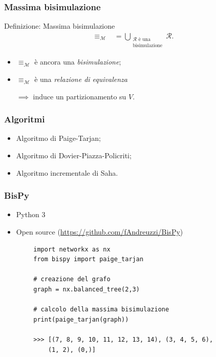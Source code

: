 \documentclass{beamer}
\begin{document}
\begin{frame}\frametitle{Massima bisimulazione}
    \begin{block}{Definizione: Massima bisimulazione}
        \begin{gather*}
            \equiv_\mathcal{M} \,\,\,\,\,= \bigcup_{\substack{\mathcal{R} \text{ è una}\\\text{bisimulazione}}} \mathcal{R}.
        \end{gather*}
    \end{block}
    \begin{itemize}
        \item $\equiv_\mathcal{M}$ è ancora una \emph{bisimulazione};
        \item $\equiv_\mathcal{M}$ è una \emph{relazione di equivalenza}

        $\implies$ induce un partizionamento su $V$.
    \end{itemize}
\end{frame}

\begin{frame}\frametitle{Algoritmi}
    \begin{itemize}
        \item Algoritmo di Paige-Tarjan;
        \item Algoritmo di Dovier-Piazza-Policriti;
        \item Algoritmo incrementale di Saha.
    \end{itemize}
\end{frame}

\begin{frame}[fragile]\frametitle{BisPy}
    \begin{itemize}
        \item Python 3
        \item Open source (\url{https://github.com/fAndreuzzi/BisPy})
    \end{itemize}


    \begin{example}
        \begin{verbatim}
        import networkx as nx
        from bispy import paige_tarjan

        # creazione del grafo
        graph = nx.balanced_tree(2,3)

        # calcolo della massima bisimulazione
        print(paige_tarjan(graph))

        >>> [(7, 8, 9, 10, 11, 12, 13, 14), (3, 4, 5, 6),
            (1, 2), (0,)]
        \end{verbatim}
    \end{example}
\end{frame}
\end{document}
